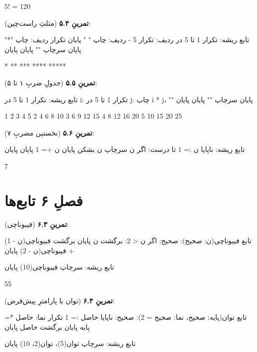 \begin{progoutfa}
5! = 120
\end{progoutfa}

\textbf{تمرینِ ۵.۴} (مثلثِ راست‌چین):
\begin{salamfa}
تابع ریشه:
    تکرار 1 تا 5 در ردیف:
        تکرار 5 - ردیف:
            چاپ " "
        پایان
        تکرار ردیف:
            چاپ "*"
        پایان
        سرچاپ ""
    پایان
پایان
\end{salamfa}

\begin{progoutfa}
    *
   **
  ***
 ****
*****
\end{progoutfa}

\textbf{تمرینِ ۵.۵} (جدولِ ضربِ ۱ تا ۵):
\begin{salamfa}
تابع ریشه:
    تکرار 1 تا 5 در i:
        تکرار 1 تا 5 در j:
            چاپ i * j، ""
        پایان
        سرچاپ ""
    پایان
پایان
\end{salamfa}

\begin{progoutfa}
1 2 3 4 5
2 4 6 8 10
3 6 9 12 15
4 8 12 16 20
5 10 15 20 25
\end{progoutfa}

\textbf{تمرینِ ۵.۶} (نخستین مضربِ ۷):
\begin{salamfa}
تابع ریشه:
    ناپایا ن := 1
    تا درست:
        اگر ن %
            سرچاپ ن
            بشکن
        پایان
        ن += 1
    پایان
پایان
\end{salamfa}

\begin{progoutfa}
7
\end{progoutfa}

\section*{فصلِ ۶ تابع‌ها}
{}

\textbf{تمرینِ ۶.۳} (فیبوناچی):
\begin{salamfa}
تابع فیبوناچی(ن: صحیح): صحیح:
    اگر ن < 2:
        برگشت ن
    پایان
    برگشت فیبوناچی(ن - 1) + فیبوناچی(ن - 2)
پایان

تابع ریشه:
    سرچاپ فیبوناچی(10)
پایان
\end{salamfa}

\begin{progoutfa}
55
\end{progoutfa}

\textbf{تمرینِ ۶.۴} (توان با پارامترِ پیش‌فرض):
\begin{salamfa}
تابع توان(پایه: صحیح، نما: صحیح = 2): صحیح:
    ناپایا حاصل := 1
    تکرار نما:
        حاصل *= پایه
    پایان
    برگشت حاصل
پایان

تابع ریشه:
    سرچاپ توان(5)، توان(2، 10)
پایان
\end{salamfa}

